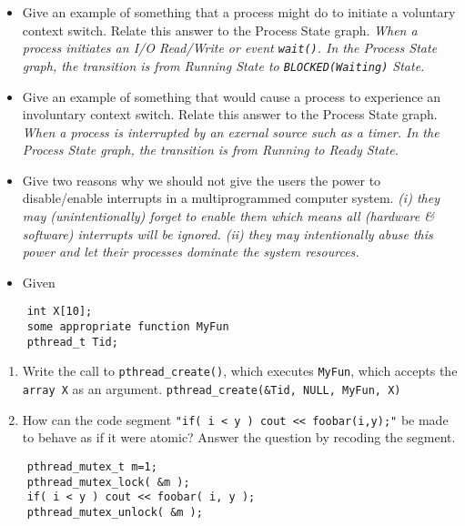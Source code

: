 \documentclass[10pt,landscape]{article}
\begin{document}
\begin{multicols}{4}
\begin{itemize}
    \item Give an example of something that a process might do to initiate a voluntary context switch.  Relate this answer to the Process State graph. \textit{When a process initiates an I/O Read/Write or event \texttt{wait()}. In the Process State graph, the transition is from Running State to \texttt{BLOCKED(Waiting)} State.}
    \item Give an example of something that would cause a process to experience an involuntary context switch.  Relate this answer to the Process State graph.  \textit{When a process is interrupted by an exernal source such as a timer.  In the Process State graph, the transition is from Running to Ready State.}
    \item Give two reasons why we should not give the users the power to disable/enable interrupts in a multiprogrammed computer system.  \textit{(i) they may (unintentionally) forget to enable them which means all (hardware \& software) interrupts will be ignored.  (ii) they may intentionally abuse this power and let their processes dominate the system resources.}
    \item Given
\end{itemize}

\begin{verbatim}
    int X[10];
    some appropriate function MyFun
    pthread_t Tid;
\end{verbatim}
\begin{enumerate}
    \item Write the call to \verb$pthread_create()$, which executes \verb$MyFun$, which accepts the \verb$array X$ as an argument. \verb$pthread_create(&Tid, NULL, MyFun, X)$
    \item How can the code segment \verb$"if( i < y ) cout << foobar(i,y);"$ be made to behave as if it were atomic? Answer the question by recoding the segment.
\end{enumerate}
\begin{verbatim}
    pthread_mutex_t m=1;
    pthread_mutex_lock( &m );
    if( i < y ) cout << foobar( i, y );
    pthread_mutex_unlock( &m );
\end{verbatim}


\end{multicols}
\end{document}
